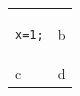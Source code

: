 \documentclass{article}
\begin{document}
\begin{tabular}{p{4cm}l}
\begin{lstlisting}[numbers=none]
x=1;
\end{lstlisting} & b \\
c & d \\
\end{tabular}
\end{document}
